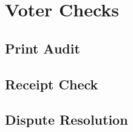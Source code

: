 \section{Voter Checks}

\subsection{Print Audit}





\subsection{Receipt Check}




\subsection{Dispute Resolution}

